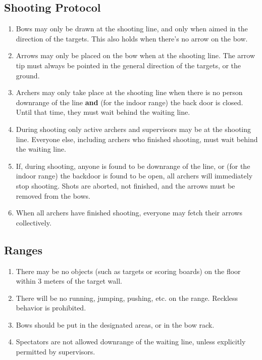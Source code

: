 \documentclass[a4paper]{article}
\begin{document}
\subsection{Shooting Protocol}

\begin{enumerate}
  \item Bows may only be drawn at the { shooting line}, and only when aimed in the direction of the targets. This also holds when there's no arrow on the bow.
  \item Arrows may only be placed on the bow when at the { shooting line}. The arrow tip must always be pointed in the general direction of the targets, or the ground.
  \item { Archers} may only take place at the { shooting line} when there is no person { downrange of the line} {\bf and} (for the indoor range) the back door is closed. Until that time, they must wait behind the { waiting line}.
  \item During shooting only active { archers} and { supervisors} may be at the { shooting line}. Everyone else, including { archers} who finished shooting, must wait behind the { waiting line}.
  \item If, during shooting, anyone is found to be { downrange of the line}, or (for the indoor range) the backdoor is found to be open, all { archers} will immediately stop shooting. Shots are aborted, not finished, and the arrows must be removed from the bows.
  \item When all { archers} have finished shooting, everyone may fetch their arrows collectively.
\end{enumerate}

\subsection{Ranges}

\begin{enumerate}
  \item There may be no objects (such as targets or scoring boards) on the floor within 3 meters of the target wall.
  \item There will be no running, jumping, pushing, etc. on the range. Reckless behavior is prohibited.
  \item Bows should be put in the designated areas, or in the bow rack.
  \item Spectators are not allowed downrange of the { waiting line}, unless explicitly permitted by supervisors.
\end{enumerate}
\end{document}
